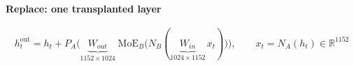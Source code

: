 \documentclass[border=40pt]{standalone}
\begin{document}
\begin{minipage}{26cm}
{\sffamily\bfseries\Large\color{muted} Replace: one transplanted layer}\par\vspace{-14pt}
{\LARGE
\begin{gather*}
h^{\mathrm{out}}_t = h_t + P_A\Big(\underbrace{W_{out}}_{1152\times1024}\;\mathrm{MoE}_B\big(N_B(\underbrace{W_{in}}_{1024\times1152}\,x_t)\big)\Big),
\qquad x_t = N_A(h_t) \in \mathbb{R}^{1152}
\end{gather*}}
\end{minipage}
\end{document}
